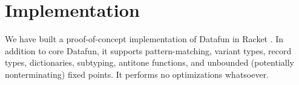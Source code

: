 \section{Implementation}
We have built a proof-of-concept implementation of Datafun in Racket
. In addition to core Datafun, it supports pattern-matching, variant
types, record types, dictionaries, subtyping, antitone functions, and unbounded
(potentially nonterminating) fixed points. It performs no optimizations
whatsoever.


